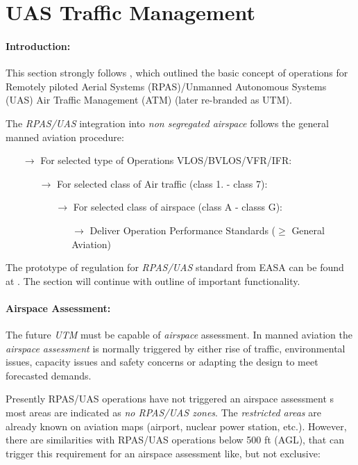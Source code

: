 \section{UAS Traffic Management}\label{sec:UTM}
\paragraph{Introduction:} This section strongly follows \cite{eurocontrol2018rpasatm}, which outlined the basic concept of operations for Remotely piloted Aerial Systems (RPAS)/Unmanned Autonomous Systems (UAS) Air Traffic Management (ATM) (later re-branded as UTM).

The \emph{RPAS/UAS} integration into \emph{non segregated airspace} follows the general manned aviation procedure:
\begin{itemize}
    \item[$\to$] For selected type of Operations VLOS/BVLOS/VFR/IFR:
    \begin{itemize}
        \item[$\to$] For selected class of Air traffic (class 1. - class 7):
        \begin{itemize}
            \item[$\to$] For selected class of airspace (class A -  classs G):
            \begin{itemize}
                \item[$\to$] Deliver Operation Performance Standards ($\ge$ General Aviation)
            \end{itemize}
        \end{itemize}
    \end{itemize}
\end{itemize}

\noindent  The prototype of regulation for \emph{RPAS/UAS} standard from EASA can be found at \cite{easa2016rpasroperegul}. The section will continue with outline of important functionality.

\paragraph{Airspace Assessment:} The future \emph{UTM} must be capable of \emph{airspace} assessment. In manned aviation the \emph{airspace assessment} is normally triggered by either rise of traffic, environmental issues, capacity issues and safety concerns or adapting the design to meet forecasted demands.

Presently RPAS/UAS operations have not triggered an airspace assessment s most areas are indicated as \emph{no RPAS/UAS zones}. The \emph{restricted areas} are already known on aviation maps (airport, nuclear power station, etc.). However, there are similarities with RPAS/UAS operations below 500 ft (AGL), that can trigger this requirement for an airspace assessment like, but not exclusive:

